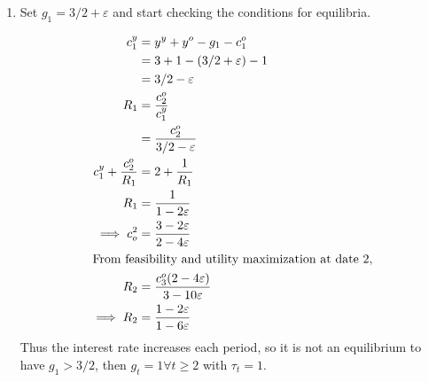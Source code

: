 \documentclass[11pt]{article}
\begin{document}
\begin{enumerate}[label=\alph*)]
\item Set \(g_1 = 3/2 + \varepsilon\) and start checking the conditions for equilibria.

\begin{align*}
c_1^y &= y^y + y^o - g_1 - c_1^o \\
&= 3 + 1 - (3/2 + \varepsilon) - 1 \\
&= 3/2 - \varepsilon\\
R_1 &= \frac{c_2^o}{c_1^y}\\
&= \frac{c_2^o}{3/2 - \varepsilon}\\
c_1^y + \frac{c_2^o}{R_1} &= 2 + \frac{1}{R_1}\\
R_1 &= \frac{1}{1 - 2 \varepsilon}\\
\implies c_o^2 &= \frac{3 - 2\varepsilon}{2 - 4\varepsilon}\\
\intertext{From feasibility and utility maximization at date 2,}
R_2 &= \frac{c_3^o(2 - 4\varepsilon)}{3 - 10\varepsilon}\\
\implies R_2 &= \frac{1 - 2\varepsilon}{1 - 6 \varepsilon}
\end{align*}
Thus the interest rate increases each period, so it is not an equilibrium to have \(g_1 > 3/2\), then \(g_t = 1 \forall t \ge 2\) with \(\tau_t = 1\).
  \end{enumerate}
\end{document}
